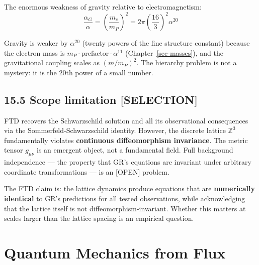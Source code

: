 \documentclass[
  11pt,
  letterpaper,
  twoside,
  openright]{book}
\begin{document}
The enormous weakness of gravity relative to electromagnetism: \[
\frac{\alpha_G}{\alpha} = \left(\frac{m_e}{m_P}\right)^2 = 2\pi \left(\frac{16}{3}\right)^2 \alpha^{20}
\tag{15.5}
\]

Gravity is weaker by \(\alpha^{20}\) (twenty powers of the fine
structure constant) because the electron mass is
\(m_P \cdot \text{prefactor} \cdot \alpha^{11}\)
(Chapter~\ref{sec-masses}), and the gravitational coupling scales as
\((m/m_P)^2\). The hierarchy problem is not a mystery: it is the 20th
power of a small number.

\section{15.5 Scope limitation
{[}SELECTION{]}}\label{scope-limitation-selection}

\begin{tcolorbox}[enhanced jigsaw, coltitle=black, colbacktitle=quarto-callout-warning-color!10!white, toprule=.15mm, colframe=quarto-callout-warning-color-frame, arc=.35mm, opacityback=0, bottomtitle=1mm, toptitle=1mm, breakable, colback=white, titlerule=0mm, opacitybacktitle=0.6, title=\textcolor{quarto-callout-warning-color}{\faExclamationTriangle}\hspace{0.5em}{Honest limitation}, rightrule=.15mm, bottomrule=.15mm, leftrule=.75mm, left=2mm]

FTD recovers the Schwarzschild solution and all its observational
consequences via the Sommerfeld-Schwarzschild identity. However, the
discrete lattice \(\mathbb{Z}^3\) fundamentally violates
\textbf{continuous diffeomorphism invariance}. The metric tensor
\(g_{\mu\nu}\) is an emergent object, not a fundamental field. Full
background independence --- the property that GR's equations are
invariant under arbitrary coordinate transformations --- is an
{[}OPEN{]} problem.

The FTD claim is: the lattice dynamics produce equations that are
\textbf{numerically identical} to GR's predictions for all tested
observations, while acknowledging that the lattice itself is not
diffeomorphism-invariant. Whether this matters at scales larger than the
lattice spacing is an empirical question.

\end{tcolorbox}

\chapter{Quantum Mechanics from Flux}\label{sec-qm}
\end{document}

